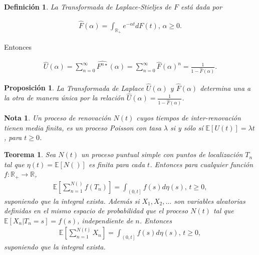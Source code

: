 \documentclass{article}
\newtheorem{Def}{Definición}
\newtheorem{Teo}{Teorema}
\newtheorem{Note}{Nota}
\newtheorem{Prop}{Proposición}
\newcommand{\rea}{\mathbb{R}}
\newcommand{\esp}{\mathbb{E}}
\begin{document}
\begin{Def}
La Transformada de Laplace-Stieljes de $F$ est\'a dada por

\begin{eqnarray*}
\hat{F}\left(\alpha\right)=\int_{\rea_{+}}e^{-\alpha t}dF\left(t\right)\textrm{,  }\alpha\geq0.
\end{eqnarray*}
\end{Def}

Entonces

\begin{eqnarray*}
\hat{U}\left(\alpha\right)=\sum_{n=0}^{\infty}\hat{F^{n\star}}\left(\alpha\right)=\sum_{n=0}^{\infty}\hat{F}\left(\alpha\right)^{n}=\frac{1}{1-\hat{F}\left(\alpha\right)}.
\end{eqnarray*}


\begin{Prop}
La Transformada de Laplace $\hat{U}\left(\alpha\right)$ y $\hat{F}\left(\alpha\right)$ determina una a la otra de manera \'unica por la relaci\'on $\hat{U}\left(\alpha\right)=\frac{1}{1-\hat{F}\left(\alpha\right)}$.
\end{Prop}


\begin{Note}
Un proceso de renovaci\'on $N\left(t\right)$ cuyos tiempos de inter-renovaci\'on tienen media finita, es un proceso Poisson con tasa $\lambda$ si y s\'olo s\'i $\esp\left[U\left(t\right)\right]=\lambda t$, para $t\geq0$.
\end{Note}


\begin{Teo}
Sea $N\left(t\right)$ un proceso puntual simple con puntos de localizaci\'on $T_{n}$ tal que $\eta\left(t\right)=\esp\left[N\left(\right)\right]$ es finita para cada $t$. Entonces para cualquier funci\'on $f:\rea_{+}\rightarrow\rea$,
\begin{eqnarray*}
\esp\left[\sum_{n=1}^{N\left(\right)}f\left(T_{n}\right)\right]=\int_{\left(0,t\right]}f\left(s\right)d\eta\left(s\right)\textrm{,  }t\geq0,
\end{eqnarray*}
suponiendo que la integral exista. Adem\'as si $X_{1},X_{2},\ldots$ son variables aleatorias definidas en el mismo espacio de probabilidad que el proceso $N\left(t\right)$ tal que $\esp\left[X_{n}|T_{n}=s\right]=f\left(s\right)$, independiente de $n$. Entonces
\begin{eqnarray*}
\esp\left[\sum_{n=1}^{N\left(t\right)}X_{n}\right]=\int_{\left(0,t\right]}f\left(s\right)d\eta\left(s\right)\textrm{,  }t\geq0,
\end{eqnarray*} 
suponiendo que la integral exista. 
\end{Teo}
\end{document}

